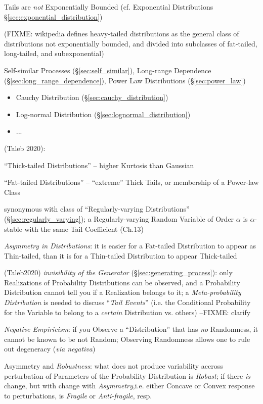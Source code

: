 Tails are \emph{not} Exponentially Bounded (cf. Exponential Distributions
\S\ref{sec:exponential_distribution})

(FIXME: wikipedia defines heavy-tailed distributions as the general class of
distributions not exponentially bounded, and divided into subclasses of
fat-tailed, long-tailed, and subexponential)

\fist Self-similar Processes (\S\ref{sec:self_similar}), Long-range Dependence
(\S\ref{sec:long_range_dependence}), Power Law Distributions
(\S\ref{sec:power_law})

\begin{itemize}
  \item Cauchy Distribution (\S\ref{sec:cauchy_distribution})
  \item Log-normal Distribution (\S\ref{sec:lognormal_distribution})
  \item ...
\end{itemize}

(Taleb 2020):

``Thick-tailed Distributions'' -- higher Kurtosis than Gaussian

``Fat-tailed Distributions'' -- ``extreme'' Thick Tails, or membership of a
Power-law Class

synonymous with class of ``Regularly-varying Distributions''
(\S\ref{sec:regularly_varying}); a Regularly-varying Random Variable of Order
$\alpha$ is $\alpha$-stable with the same Tail Coefficient
(Ch.13)

\emph{Asymmetry in Distributions}: it is easier for a Fat-tailed Distribution to
appear as Thin-tailed, than it is for a Thin-tailed Distribution to appear
Thick-tailed

(Taleb2020) \emph{invisibility of the Generator}
(\S\ref{sec:generating_process}): only Realizations of Probability Distributions
can be observed, and a Probability Distribution cannot tell you if a Realization
belongs to it; a \emph{Meta-probability Distribution} is needed to discuss
``\emph{Tail Events}'' (i.e. the Conditional Probability for the Variable to
belong to a \emph{certain} Distribution vs. others) --FIXME: clarify

\emph{Negative Empiricism}: if you Observe a ``Distribution'' that has \emph{no}
Randomness, it cannot be known to be not Random; Observing Randomness allows one
to rule out degeneracy (\emph{via negativa})

Asymmetry and \emph{Robustness}: what does not produce variability accross
perturbation of Parameters of the Probability Distribution is \emph{Robust}; if
there \emph{is} change, but with change with \emph{Asymmetry},i.e. either
Concave or Convex response to perturbations, is \emph{Fragile} or
\emph{Anti-fragile}, resp.

